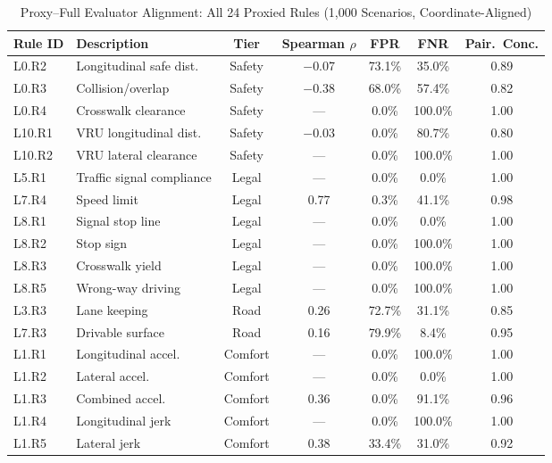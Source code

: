\begin{table}
\centering
\caption{Proxy--Full Evaluator Alignment: All 24 Proxied Rules (1{,}000 Scenarios, Coordinate-Aligned)}
\label{tab:proxy_correlation_detailed}
\small
\begin{tabular}{llccccc}
\toprule
\textbf{Rule ID} & \textbf{Description} & \textbf{Tier} & \textbf{Spearman $\rho$} & \textbf{FPR} & \textbf{FNR} & \textbf{Pair.\ Conc.} \\
\midrule
L0.R2  & Longitudinal safe dist.   & Safety  & $-$0.07 & 73.1\% & 35.0\% & 0.89 \\
L0.R3  & Collision/overlap         & Safety  & $-$0.38 & 68.0\% & 57.4\% & 0.82 \\
L0.R4  & Crosswalk clearance       & Safety  & ---     &  0.0\% &100.0\% & 1.00 \\
L10.R1 & VRU longitudinal dist.    & Safety  & $-$0.03 &  0.0\% & 80.7\% & 0.80 \\
L10.R2 & VRU lateral clearance     & Safety  & ---     &  0.0\% &100.0\% & 1.00 \\
\midrule
L5.R1  & Traffic signal compliance & Legal   & ---     &  0.0\% &  0.0\% & 1.00 \\
L7.R4  & Speed limit               & Legal   &   0.77 &  0.3\% & 41.1\% & 0.98 \\
L8.R1  & Signal stop line          & Legal   & ---     &  0.0\% &  0.0\% & 1.00 \\
L8.R2  & Stop sign                 & Legal   & ---     &  0.0\% &100.0\% & 1.00 \\
L8.R3  & Crosswalk yield           & Legal   & ---     &  0.0\% &100.0\% & 1.00 \\
L8.R5  & Wrong-way driving         & Legal   & ---     &  0.0\% &100.0\% & 1.00 \\
\midrule
L3.R3  & Lane keeping              & Road    &   0.26 & 72.7\% & 31.1\% & 0.85 \\
L7.R3  & Drivable surface          & Road    &   0.16 & 79.9\% &  8.4\% & 0.95 \\
\midrule
L1.R1  & Longitudinal accel.       & Comfort & ---     &  0.0\% &100.0\% & 1.00 \\
L1.R2  & Lateral accel.            & Comfort & ---     &  0.0\% &  0.0\% & 1.00 \\
L1.R3  & Combined accel.           & Comfort &   0.36 &  0.0\% & 91.1\% & 0.96 \\
L1.R4  & Longitudinal jerk         & Comfort & ---     &  0.0\% &100.0\% & 1.00 \\
L1.R5  & Lateral jerk              & Comfort &   0.38 & 33.4\% & 31.0\% & 0.92 \\

\end{tabular}
\end{table}

